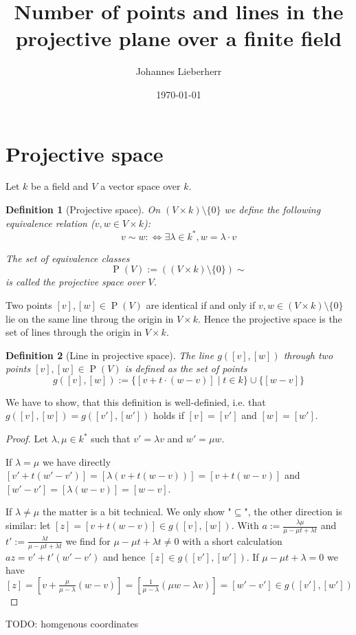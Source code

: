 \documentclass{article}
\title{Number of points and lines in the projective plane over a finite field}
\author{Johannes Lieberherr}
\date{\today}
\newtheorem{definition}{Definition}
\begin{document}
	\maketitle
	\section{Projective space}
	Let $k$ be a field and $V$ a vector space over $k$.
	
	\begin{definition}[Projective space]
		On $(V\times k)\setminus \{0\}$ we define the following equivalence relation ($v, w \in V\times k$):
		$$v\sim w :\iff \exists \lambda \in k^*, w = \lambda \cdot v$$
		
		The set of equivalence classes
		$$\operatorname{P}(V):=((V\times k)\setminus \{0\})\sim$$
		is called the projective space over $V$.
	\end{definition}

	Two points $[v],[w]\in\operatorname{P}(V)$ are identical if and only if $v, w\in (V\times k)\setminus \{0\}$ lie on the same line throug the origin in $V\times k$. Hence the projective space is the set of lines through the origin in $V\times k$.
	
	\begin{definition}[Line in projective space]
		The line $g([v],[w])$ through two points  $[v],[w]\in\operatorname{P}(V)$ is defined as the set of points
		$$g([v],[w]):=\{[v+t\cdot (w-v) ] \mid t\in k\} \cup \{[w-v]\}$$	
	\end{definition}
	We have to show, that this definition is well-definied, i.e. that $g([v],[w])=g([v'],[w'])$ holds if $[v]=[v']$ and $[w]=[w']$.
	\begin{proof}
		Let $\lambda, \mu \in k^*$ such that $v'=\lambda v$ and $w'=\mu w$.
		
		If $\lambda=\mu$ we have directly $[v'+t(w'-v')]=[\lambda (v+t(w-v))]=[v+t(w-v)]$ and $[w'-v']=[\lambda(w-v)]=[w-v]$.
		
		If $\lambda \neq \mu$ the matter is a bit technical. We only show "$\subseteq$", the other direction is similar: let $[z]=[v+t(w-v)]\in g([v], [w])$. With $a:=\frac{\lambda \mu}{\mu-\mu t+\lambda t}$ and $t':=\frac{\lambda t}{\mu-\mu t + \lambda t}$ we find for $\mu-\mu t + \lambda t\neq 0$ with a short calculation $a z = v'+t'(w'-v')$ and hence $[z]\in g([v'], [w'])$. If $\mu-\mu t + \lambda = 0$ we have $[z]=[v+\frac{\mu}{\mu-\lambda}(w-v)]=[\frac{1}{\mu - \lambda}(\mu w - \lambda v)]=[w'-v']\in g([v'], [w'])$
	\end{proof}
	TODO: homgenous coordinates
\end{document}
